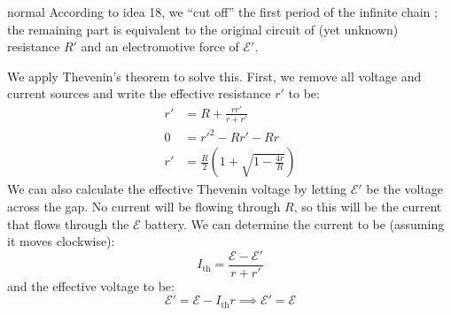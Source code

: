 \begin{solution}{normal}
According to idea 18,  we “cut off” the first period of the infinite chain ; the remaining part is equivalent to the original circuit of (yet unknown) resistance $R'$ and an electromotive force of $\mathcal{E}'$. 
\begin{center}
\end{center}
We apply Thevenin's theorem to solve this. First, we remove all voltage and current sources and write the effective resistance $r'$ to be:
\begin{align*}
    r' &= R + \frac{rr'}{r+r'} \\ 
    0 &= {r'}^2-Rr'-Rr \\ 
    r' &= \frac{R}{2} \left(1+\sqrt{1-\frac{4r}{R}}\right)
\end{align*}
We can also calculate the effective Thevenin voltage by letting $\mathcal{E}'$ be the voltage across the gap. No current will be flowing through $R$, so this will be the current that flows through the $\mathcal{E}$ battery. We can determine the current to be (assuming it moves clockwise):
$$
    I_\text{th} = \frac{\mathcal{E}-\mathcal{E}'}{r+r'}
$$
and the effective voltage to be:
$$
\mathcal{E}' = \mathcal{E} - I_\text{th}r \implies \mathcal{E}' = \mathcal{E}
$$
\end{solution}